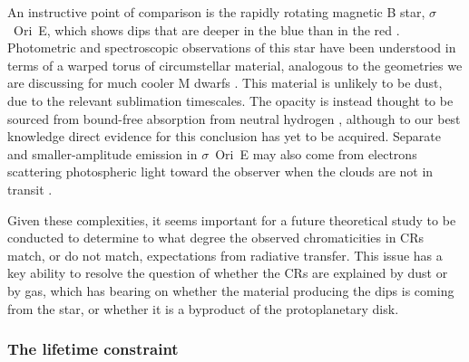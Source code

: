 \documentclass[11pt,twocolumn,tighten]{aastex63}
\begin{document}
An instructive point of comparison is the rapidly rotating magnetic B
star, $\sigma$~Ori~E, which shows dips that are deeper in the blue
than in the red \citep{1977ApJ...216L..31H}.  Photometric and
spectroscopic observations of this star have been understood in terms
of a warped torus of circumstellar material, analogous to the
geometries we are discussing for much cooler M dwarfs
\citep{1978ApJ...224L...5L,1985Ap&SS.116..285N,2005ApJ...630L..81T}.
This material is unlikely to be dust, due to the relevant sublimation
timescales.  The opacity is instead thought to be sourced from
bound-free absorption from neutral hydrogen
\citep{1985Ap&SS.116..285N}, although to our best knowledge direct
evidence for this conclusion has yet to be acquired.  Separate and
smaller-amplitude emission in $\sigma$~Ori~E may also come from
electrons scattering photospheric light toward the observer when the
clouds are not in transit \citep{2022MNRAS.511.4815B}.

Given these complexities, it seems important for a future theoretical
study to be conducted to determine to what degree the observed
chromaticities in CRs match, or do not match, expectations from
radiative transfer.  This issue has a key ability to resolve the
question of whether the CRs are explained by dust or by gas, which
has bearing on whether the material producing the dips is coming from
the star, or whether it is a byproduct of the protoplanetary disk.





\subsubsection{The lifetime constraint}
\end{document}

